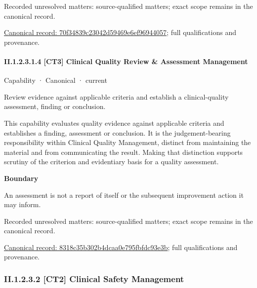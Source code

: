 {\small Recorded unresolved matters: source-qualified matters; exact scope remains in the canonical record.}\par
{\footnotesize \href{../../../../continuum/strategy/capability/70f34839c23042d59469e6ef96944057.md}{Canonical record: 70f34839c23042d59469e6ef96944057}; full qualifications and provenance.}\par
\paragraph*{II.1.2.3.1.4 [CT3] Clinical Quality Review \& Assessment Management}
\label{navigation:II.1.2.3.1.4}

\label{element:8318c35b302b4dcaa0e795fbfdc93e3b}
{\small Capability · Canonical · current}\par

Review evidence against applicable criteria and establish a clinical-quality assessment, finding or conclusion.



This capability evaluates quality evidence against applicable criteria and establishes a finding, assessment or conclusion. It is the judgement-bearing responsibility within Clinical Quality Management, distinct from maintaining the material and from communicating the result. Making that distinction supports scrutiny of the criterion and evidentiary basis for a quality assessment.



\textbf{Boundary}



An assessment is not a report of itself or the subsequent improvement action it may inform.


{\small Recorded unresolved matters: source-qualified matters; exact scope remains in the canonical record.}\par
{\footnotesize \href{../../../../continuum/strategy/capability/8318c35b302b4dcaa0e795fbfdc93e3b.md}{Canonical record: 8318c35b302b4dcaa0e795fbfdc93e3b}; full qualifications and provenance.}\par
\subsubsection*{II.1.2.3.2 [CT2] Clinical Safety Management}
\label{navigation:II.1.2.3.2}

